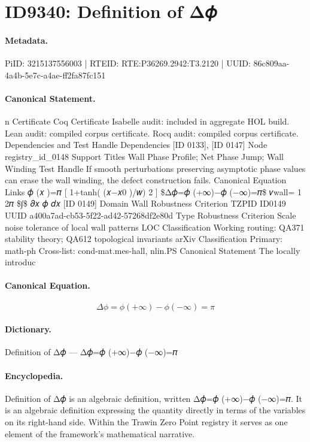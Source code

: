 \section*{ID9340: Definition of Δ𝜙}
\paragraph{Metadata.}
PiID: 3215137556003 | RTEID: RTE:P36269.2942:T3.2120 | UUID: 86c809aa-4a4b-5e7c-a4ae-ff2fa87fc151

\paragraph{Canonical Statement.}
n Certificate Coq Certificate Isabelle audit: included in aggregate HOL build. Lean audit: compiled corpus certificate. Rocq audit: compiled corpus certificate. Dependencies and Test Handle Dependencies [ID 0133], [ID 0147] Node registry\_id\_0148 Support Titles Wall Phase Profile; Net Phase Jump; Wall Winding Test Handle If smooth perturbations preserving asymptotic phase values can erase the wall winding, the defect construction fails. Canonical Equation Links 𝜙 (𝑥 )=𝜋 [ 1+tanh( (𝑥−𝑥0 )/𝑤) 2 ] \$Δ𝜙=𝜙 (+∞)−𝜙 (−∞)=𝜋\$ 𝜈wall= 1 2𝜋 \$∫\$ 𝜕𝑥 𝜙 𝑑𝑥 [ID 0149] Domain Wall Robustness Criterion TZPID ID0149 UUID a400a7ad-cb53-5f22-ad42-57268df2e80d Type Robustness Criterion Scale noise tolerance of local wall patterns LOC Classification Working routing: QA371 stability theory; QA612 topological invariants arXiv Classification Primary: math-ph Cross-list: cond-mat.mes-hall, nlin.PS Canonical Statement The locally introduc

\paragraph{Canonical Equation.}
\[
Δ𝜙=𝜙 (+∞)−𝜙 (−∞)=𝜋
\]

\paragraph{Dictionary.}
Definition of Δ𝜙 — Δ𝜙=𝜙 (+∞)−𝜙 (−∞)=𝜋

\paragraph{Encyclopedia.}
Definition of Δ𝜙 is an algebraic definition, written Δ𝜙=𝜙 (+∞)−𝜙 (−∞)=𝜋. It is an algebraic definition expressing the quantity directly in terms of the variables on its right-hand side. Within the Trawin Zero Point registry it serves as one element of the framework's mathematical narrative.

